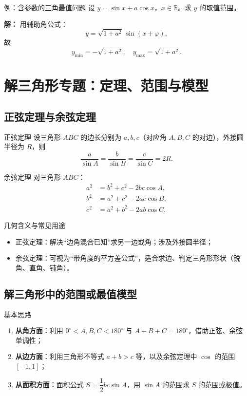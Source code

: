 \documentclass[a4paper,11pt]{ctexart}
\begin{document}
\begin{examplebox}{例：含参数的三角最值问题}
设 $y = \sin x + a\cos x$，$x\in\mathbb{R}$。求 $y$ 的取值范围。
\par\textbf{解：} 用辅助角公式：
\[
y = \sqrt{1+a^2}\,\sin(x+\varphi),
\]
故
\[
y_{\min} = -\sqrt{1+a^2},\quad y_{\max} = \sqrt{1+a^2}.
\]
\end{examplebox}

\section{解三角形专题：定理、范围与模型}
\label{sec:triangles}

\subsection{正弦定理与余弦定理}

\begin{theorembox}{正弦定理}
设三角形 $ABC$ 的边长分别为 $a,b,c$（对应角 $A,B,C$ 的对边），外接圆半径为 $R$，则
\[
\frac{a}{\sin A} = \frac{b}{\sin B} = \frac{c}{\sin C} = 2R.
\]
\end{theorembox}

\begin{theorembox}{余弦定理}
对三角形 $ABC$：
\begin{align*}
a^2 &= b^2 + c^2 - 2bc\cos A,\\
b^2 &= a^2 + c^2 - 2ac\cos B,\\
c^2 &= a^2 + b^2 - 2ab\cos C.
\end{align*}
\end{theorembox}

\begin{summarybox}{几何含义与常见用途}
\begin{itemize}
  \item 正弦定理：解决“边角混合已知”求另一边或角；涉及外接圆半径；
  \item 余弦定理：可视为“带角度的平方差公式”，适合求边、判定三角形形状（锐角、直角、钝角）。
\end{itemize}
\end{summarybox}

\subsection{解三角形中的范围或最值模型}

\begin{summarybox}{基本思路}
\begin{enumerate}
  \item \textbf{从角方面}：利用 $0^\circ<A,B,C<180^\circ$ 与 $A+B+C=180^\circ$，借助正弦、余弦单调性；
  \item \textbf{从边方面}：利用三角形不等式 $a+b>c$ 等，以及余弦定理中 $\cos$ 的范围 $[-1,1]$；
  \item \textbf{从面积方面}：面积公式 $S=\dfrac{1}{2}bc\sin A$，用 $\sin A$ 的范围求 $S$ 的范围或极值。
\end{enumerate}
\end{summarybox}
\end{document}
